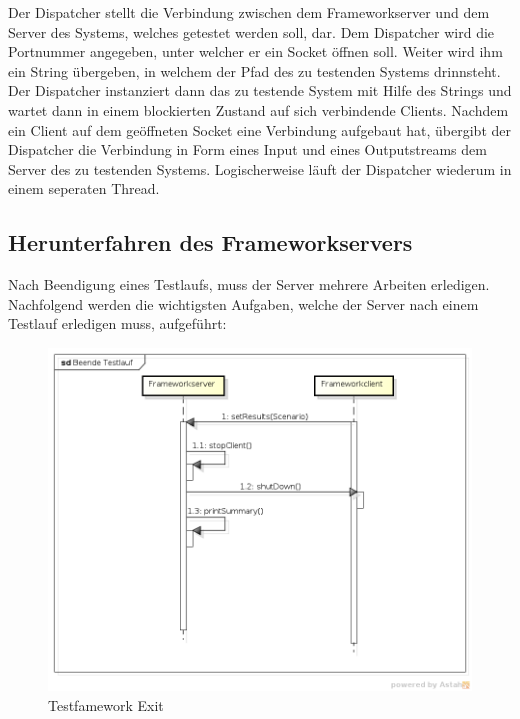 Der Dispatcher stellt die Verbindung zwischen dem Frameworkserver und dem Server des Systems, welches getestet werden soll, dar. Dem Dispatcher wird die Portnummer angegeben, unter welcher er ein Socket öffnen soll. Weiter wird ihm ein String übergeben, in welchem der Pfad des zu testenden Systems drinnsteht. Der Dispatcher instanziert dann das zu testende System mit Hilfe des Strings und wartet dann in einem blockierten Zustand auf sich verbindende Clients. Nachdem ein Client auf dem geöffneten Socket eine Verbindung aufgebaut hat, übergibt der Dispatcher die Verbindung in Form eines Input und eines Outputstreams dem Server des zu testenden Systems.\newline
Logischerweise läuft der Dispatcher wiederum in einem seperaten Thread.

\subsection{Herunterfahren des Frameworkservers}
\label{sec:herunterfahrenFramework}

Nach Beendigung eines Testlaufs, muss der Server mehrere Arbeiten erledigen. Nachfolgend werden die wichtigsten Aufgaben, welche der Server nach einem Testlauf erledigen muss, aufgeführt:


\begin{figure}
\begin{center}
\includegraphics[scale=0.2]{image_testFramework/BeendeTestlauf.png}
\end{center}
\caption{Testfamework Exit}
\label{labelname}
\end{figure}

